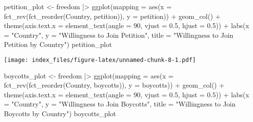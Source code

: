 \documentclass[
]{article}
\newenvironment{Shaded}{\begin{snugshade}}{\end{snugshade}}
\newcommand{\AttributeTok}[1]{\textcolor[rgb]{0.77,0.63,0.00}{#1}}
\newcommand{\DecValTok}[1]{\textcolor[rgb]{0.00,0.00,0.81}{#1}}
\newcommand{\FloatTok}[1]{\textcolor[rgb]{0.00,0.00,0.81}{#1}}
\newcommand{\FunctionTok}[1]{\textcolor[rgb]{0.00,0.00,0.00}{#1}}
\newcommand{\NormalTok}[1]{#1}
\newcommand{\OtherTok}[1]{\textcolor[rgb]{0.56,0.35,0.01}{#1}}
\newcommand{\SpecialCharTok}[1]{\textcolor[rgb]{0.00,0.00,0.00}{#1}}
\newcommand{\StringTok}[1]{\textcolor[rgb]{0.31,0.60,0.02}{#1}}
\begin{document}
\begin{Shaded}
\begin{Highlighting}[]
\NormalTok{petition\_plot }\OtherTok{\textless{}{-}}\NormalTok{ freedom }\SpecialCharTok{|\textgreater{}}
  \FunctionTok{ggplot}\NormalTok{(}\AttributeTok{mapping =} \FunctionTok{aes}\NormalTok{(}\AttributeTok{x =} \FunctionTok{fct\_rev}\NormalTok{(}\FunctionTok{fct\_reorder}\NormalTok{(Country, petition)),}
                       \AttributeTok{y =}\NormalTok{ petition)) }\SpecialCharTok{+}
  \FunctionTok{geom\_col}\NormalTok{() }\SpecialCharTok{+}
  \FunctionTok{theme}\NormalTok{(}\AttributeTok{axis.text.x =} \FunctionTok{element\_text}\NormalTok{(}\AttributeTok{angle =} \DecValTok{90}\NormalTok{,}
                                   \AttributeTok{vjust =} \FloatTok{0.5}\NormalTok{,}
                                   \AttributeTok{hjust =} \FloatTok{0.5}\NormalTok{)) }\SpecialCharTok{+}
  \FunctionTok{labs}\NormalTok{(}\AttributeTok{x =} \StringTok{"Country"}\NormalTok{,}
       \AttributeTok{y =} \StringTok{"Willingness to Join Petition"}\NormalTok{,}
       \AttributeTok{title =} \StringTok{"Willingness to Join Petition by Country"}\NormalTok{)}
\NormalTok{petition\_plot}
\end{Highlighting}
\end{Shaded}

\texttt{[image: index\_files/figure-latex/unnamed-chunk-8-1.pdf]}

\begin{Shaded}
\begin{Highlighting}[]
\NormalTok{boycotts\_plot }\OtherTok{\textless{}{-}}\NormalTok{ freedom }\SpecialCharTok{|\textgreater{}}
  \FunctionTok{ggplot}\NormalTok{(}\AttributeTok{mapping =} \FunctionTok{aes}\NormalTok{(}\AttributeTok{x =} \FunctionTok{fct\_rev}\NormalTok{(}\FunctionTok{fct\_reorder}\NormalTok{(Country, boycotts)),}
                       \AttributeTok{y =}\NormalTok{ boycotts)) }\SpecialCharTok{+}
  \FunctionTok{geom\_col}\NormalTok{() }\SpecialCharTok{+}
  \FunctionTok{theme}\NormalTok{(}\AttributeTok{axis.text.x =} \FunctionTok{element\_text}\NormalTok{(}\AttributeTok{angle =} \DecValTok{90}\NormalTok{,}
                                   \AttributeTok{vjust =} \FloatTok{0.5}\NormalTok{,}
                                   \AttributeTok{hjust =} \FloatTok{0.5}\NormalTok{)) }\SpecialCharTok{+}
  \FunctionTok{labs}\NormalTok{(}\AttributeTok{x =} \StringTok{"Country"}\NormalTok{,}
       \AttributeTok{y =} \StringTok{"Willingness to Join Boycotts"}\NormalTok{,}
       \AttributeTok{title =} \StringTok{"Willingness to Join Boycotts by Country"}\NormalTok{)}
\NormalTok{boycotts\_plot}
\end{Highlighting}
\end{Shaded}
\end{document}
